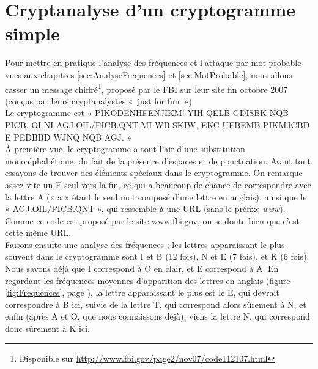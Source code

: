 \chapter{Cryptanalyse d'un cryptogramme simple\label{Apx:FBI}}
\thispagestyle{empty}
Pour mettre en pratique l'analyse des fréquences et l'attaque par
mot probable vues aux chapitres \ref{sec:AnalyseFrequences} et
\ref{sec:MotProbable}, nous allons
casser un message chiffré\footnote{Disponible sur
\url{http://www.fbi.gov/page2/nov07/code112107.html}}, 
proposé par le FBI sur leur site fin
octobre 2007 (conçus par leurs cryptanalystes «~just for fun~»)
\\
Le cryptogramme est « PIKODENHFENJIKM! YIH QELB GDISBK NQB
PICB. OI NI AGJ.OIL/PICB.QNT MI WB SKIW, EKC UFBEMB PIKMJCBD E
PEDBBD WJNQ NQB AGJ. »
\\

À première vue, le cryptogramme a tout l'air d'une substitution
monoalphabétique, du fait de la présence d'espaces et de
ponctuation.
Avant tout, essayons de trouver des éléments spéciaux dans le
cryptogramme. On remarque assez vite un E seul vers la fin, ce qui
a beaucoup de chance de correspondre avec la lettre A (« a » étant
le seul mot composé d'une lettre en anglais), ainsi que le «
AGJ.OIL/PICB.QNT », qui ressemble à une URL (sans le préfixe
\emph{www}). Comme ce code est proposé par le site
\url{www.fbi.gov}, on se doute bien que c'est cette même URL.
\\

Faisons ensuite une analyse des fréquences ; les lettres
apparaissant le plus souvent dans le cryptogramme sont I et B (12
fois), N et E (7 fois), et K (6 fois).
Nous savons déjà que I correspond à O en clair, et E correspond à
A. En regardant les fréquences moyennes d'apparition des lettres en
anglais (figure \ref{fig:Frequences}, page
\pageref{fig:Frequences}), la lettre apparaissant le plus est le E, qui devrait
correspondre à B ici, suivie de la lettre T, qui correspond alors
sûrement à N, et enfin (après A et O, que nous connaissons déjà),
viens la lettre N, qui correspond donc sûrement à K ici.
\\

